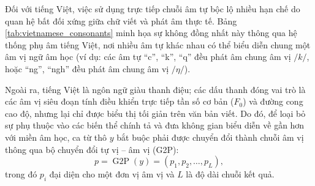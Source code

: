 \documentclass[a4paper,13pt,oneside]{report}
\begin{document}
Đối với tiếng Việt, việc sử dụng trực tiếp chuỗi âm tự bộc lộ nhiều hạn chế do quan hệ bất đối xứng giữa chữ viết và phát âm thực tế. Bảng \ref{tab:vietnamese_consonants} minh họa sự không đồng nhất này thông qua hệ thống phụ âm tiếng Việt, nơi nhiều âm tự khác nhau có thể biểu diễn chung một âm vị ngữ âm học (ví dụ: các âm tự ``c'', ``k'', ``q'' đều phát âm chung âm vị $/k/$, hoặc ``ng'', ``ngh'' đều phát âm chung âm vị $/\eta/$).

Ngoài ra, tiếng Việt là ngôn ngữ giàu thanh điệu; các dấu thanh đóng vai trò là các âm vị siêu đoạn tính điều khiển trực tiếp tần số cơ bản ($F_0$) và đường cong cao độ, nhưng lại chỉ được biểu thị tối giản trên văn bản viết. Do đó, để loại bỏ sự phụ thuộc vào các biến thể chính tả và đưa không gian biểu diễn về gần hơn với miền âm học, ca từ thô $y$ bắt buộc phải được chuyển đổi thành chuỗi âm vị thông qua bộ chuyển đổi tự vị -- âm vị (G2P):
\begin{equation}
 p = \operatorname{G2P}(y) = (p_1, p_2, \ldots, p_L),
 \label{eq:lyric_g2p}
\end{equation}
trong đó $p_i$ đại diện cho một đơn vị âm vị và $L$ là độ dài chuỗi kết quả.
\end{document}
